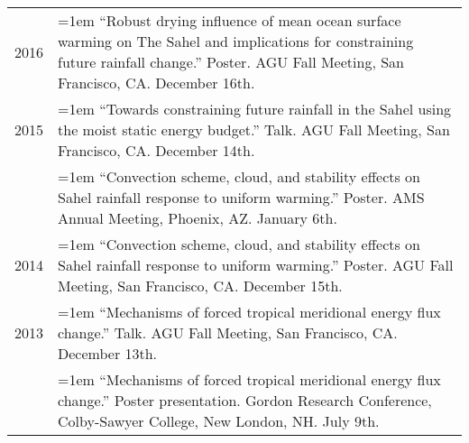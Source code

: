 \documentclass[letterpaper,11pt]{shillcv}
\begin{document}
\begin{longtable}{@{} >{\color{darkgray}} p{} p{} @{}}
2016 & \hangindent=1em ``Robust drying influence of mean ocean surface warming on The Sahel and implications for constraining future rainfall change.''  Poster.  AGU Fall Meeting, San Francisco, CA.  December 16th.\\

2015 & \hangindent=1em ``Towards constraining future rainfall in the Sahel using the moist static energy budget.'' Talk.  AGU Fall Meeting, San Francisco, CA.  December 14th.\\
     & \hangindent=1em ``Convection scheme, cloud, and stability effects on Sahel rainfall response to uniform warming.''  Poster.  AMS Annual Meeting, Phoenix, AZ. January 6th.\\
2014 & \hangindent=1em ``Convection scheme, cloud, and stability effects on Sahel rainfall response to uniform warming.''  Poster.  AGU Fall Meeting, San Francisco, CA.  December 15th.\\
2013 & \hangindent=1em ``Mechanisms of forced tropical meridional energy flux change.''  Talk.  AGU Fall Meeting, San Francisco, CA. December 13th.\\
     & \hangindent=1em ``Mechanisms of forced tropical meridional energy flux change.'' Poster presentation.  Gordon Research Conference, Colby-Sawyer College, New London, NH.  July 9th.\\

\end{longtable}
\end{document}
